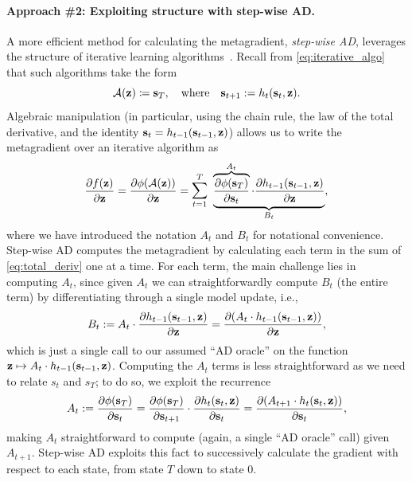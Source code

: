 \paragraph{Approach \#2: Exploiting structure with step-wise AD.} 
A more efficient method for calculating the metagradient,
{\em step-wise AD},
leverages the structure of iterative learning algorithms~\citep{werbos1990backpropagation,maclaurin2015gradient,franceschi2017forward}.
Recall from \eqref{eq:iterative_algo} that such algorithms take the form
\[
	{\mathcal{A}(\mathbf{z}) \coloneqq \mathbf{s}_{T}}, \quad \text{where} \quad {\mathbf{s}_{t+1} := h_t(\mathbf{s}_{t}, \mathbf{z})}.
\]
Algebraic manipulation 
(in particular, using the chain rule, 
the law of the total derivative,
and the identity $\mathbf{s}_{t} = h_{t-1}(\mathbf{s}_{t-1}, \mathbf{z})$)
allows us to write the metagradient over an iterative algorithm as
\begin{equation}
	\pfrac{f(\mathbf{z})}{\mathbf{z}} =
	\pfrac{\phi(\mathcal{A}(\mathbf{z}))}{\mathbf{z}} 
	= \mathlarger{\sum}_{t=1}^{T}\ 
  \underbrace{\overbrace{\pfrac{\phi(\st{T})}{\st{t}}}^{A_t} \cdot 
  \pfrac{h_{t-1}(\st{t-1}, \mathbf{z})}{\mathbf{z}}}_{B_t} \label{eq:total_deriv}, %
\end{equation}
where we have introduced the notation $A_t$ and $B_t$ for notational convenience.
Step-wise AD computes the metagradient by calculating each term in the sum of
\eqref{eq:total_deriv} one at a time. 
For each term, the main challenge lies in computing $A_t$, since given $A_t$ 
we can straightforwardly compute $B_t$ (the entire term)
by differentiating through a single model update, i.e.,
\begin{align*}
  B_t := A_t \cdot \frac{\partial h_{t-1}(\mathbf{s}_{t-1}, \mathbf{z})}{\partial \mathbf{z}}
  =  \frac{\partial (A_t \cdot h_{t-1}(\mathbf{s}_{t-1}, \mathbf{z}))}{\partial \mathbf{z}},
\end{align*}
which is just a single call to our assumed ``AD oracle'' on the function 
$\mathbf{z} \mapsto A_t \cdot h_{t-1}(\mathbf{s}_{t-1}, \mathbf{z})$.
Computing the $A_t$ terms is less straightforward as we need to relate $s_t$ and $s_T$;
to do so, we exploit the recurrence
\begin{equation}
  A_t := \frac{\partial \phi(\mathbf{s}_{T})}{\partial \mathbf{s}_{t}} 
  = \frac{\partial \phi(\mathbf{s}_{T})}{\partial \mathbf{s}_{t+1}} \cdot \frac{\partial {h_t(\mathbf{s}_{t}, \mathbf{z})}}{\partial \mathbf{s}_{t}}
  = \frac{\partial (A_{t+1} \cdot h_t(\mathbf{s}_{t}, \mathbf{z}))}{\partial \mathbf{s}_{t}},\label{eq:grad_recurrence}
\end{equation}
making $A_t$ straightforward to compute (again, a single ``AD oracle'' call) given $A_{t+1}$. 
Step-wise AD exploits this fact to successively
calculate the gradient with respect to each state, from state $T$ down to state $0$.

